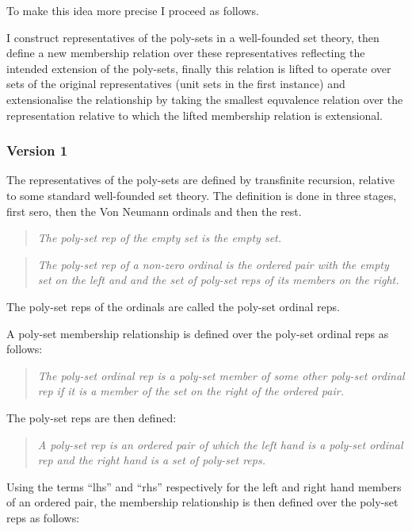 \documentclass[numreferences]{rbjk}
\begin{document}
\begin{article}
To make this idea more precise I proceed as follows.

I construct representatives of the poly-sets in a well-founded set theory, then define a new membership relation over these representatives reflecting the intended extension of the poly-sets, finally this relation is lifted to operate over sets of the original representatives (unit sets in the first instance) and extensionalise the relationship by taking the smallest equvalence relation over the representation relative to which the lifted membership relation is extensional.

\subsubsection{Version 1}

The representatives of the poly-sets are defined by transfinite recursion, relative to some standard well-founded set theory.
The definition is done in three stages, first sero, then the Von Neumann ordinals and then the rest.

\begin{quote}\label{def:poly-set rep}
{\it
The poly-set rep of the empty set is the empty set.
}
\end{quote}

\begin{quote}
\emph{
The poly-set rep of a non-zero ordinal is the ordered pair with the empty set on the left and and the set of poly-set reps of its members on the right.
}
\end{quote}

The poly-set reps of the ordinals are called the poly-set ordinal reps.

A poly-set membership relationship is defined over the poly-set ordinal reps as follows:

\begin{quote}
\emph{
The poly-set ordinal rep is a poly-set member of some other poly-set ordinal rep if it is a member of the set on the right of the ordered pair.
}
\end{quote}

The poly-set reps are then defined:

\begin{quote}
{\it
A poly-set rep is an ordered pair of which the left hand is a poly-set ordinal rep and the right hand is a set of poly-set reps.
}
\end{quote}

Using the terms ``lhs'' and ``rhs'' respectively for the left and right hand members of an ordered pair, the membership relationship is then defined over the poly-set reps as follows:


\end{article}
\end{document}
